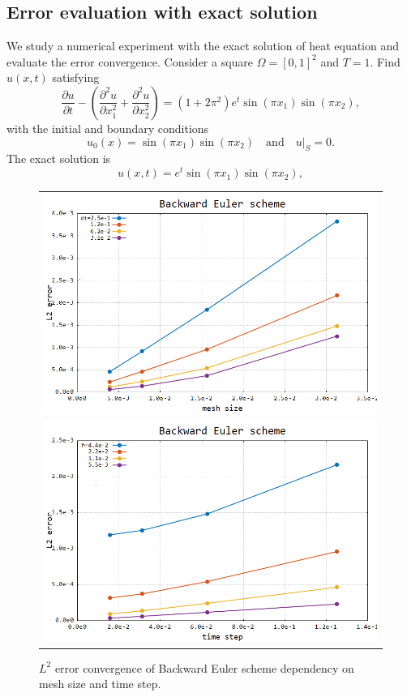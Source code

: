 \subsection{Error evaluation with exact solution}
\quad We study a numerical experiment with the exact solution of heat equation and evaluate the error convergence. Consider a square $\Omega = [0,1]^2$ and $T=1$. Find $u(x,t)$ satisfying
\begin{equation}
	\dfrac{\partial u}{\partial t} - \left(\dfrac{\partial^2 u}{\partial x_1^2} + \dfrac{\partial^2u}{\partial x_2^2}\right) = (1+2\pi^2)e^t\sin(\pi x_1) \sin(\pi x_2),
\end{equation}
with the initial and boundary conditions
$$u_0(x) = \sin(\pi x_1)\sin(\pi x_2) \quad \text{and} \quad u|_S = 0.$$
The exact solution is
$$u(x, t) = e^t\sin(\pi x_1) \sin(\pi x_2),$$
\begin{figure}[b!]
	\centering
	\begin{tabular}{c}
		\includegraphics[width=.8\linewidth]{figures/BE}\\ 
		\includegraphics[width=.8\linewidth]{figures/BEt}
	\end{tabular}
	\caption{$L^2$ error convergence of Backward Euler scheme dependency on mesh size and time step.}
	\label{fig:BE}
\end{figure}
